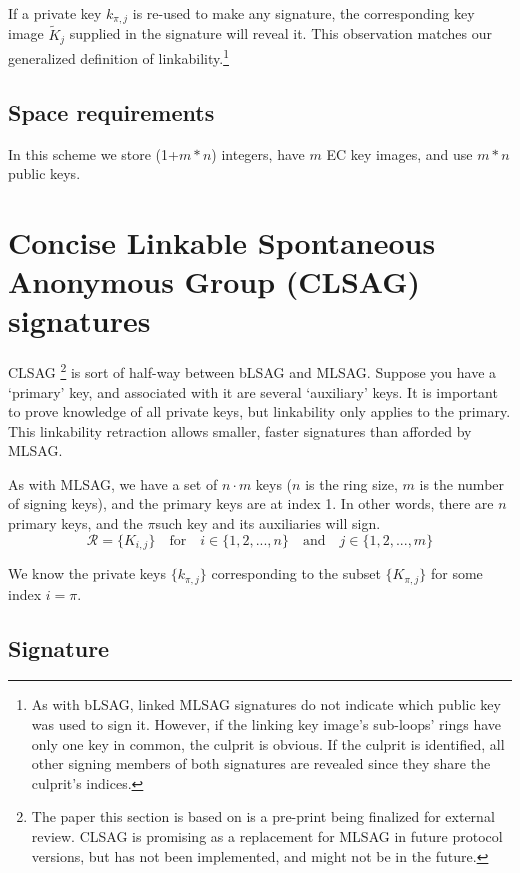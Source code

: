If a private key \(k_{\pi, j}\) is re-used to make any signature, the corresponding key image \(\tilde{K}_j\) supplied in the signature will reveal it. This observation matches our generalized definition of linkability.\footnote{As with bLSAG, linked MLSAG signatures do not indicate which public key was used to sign it. However, if the linking key image's sub-loops' rings have only one key in common, the culprit is obvious. If the culprit is identified, all other signing members of both signatures are revealed since they share the culprit's indices.}


\subsection*{Space requirements}

In this scheme we store (1+$m*n$) integers, have $m$ EC key images, and use $m*n$ public keys.



\section{Concise Linkable Spontaneous Anonymous Group (CLSAG) signatures}
\label{sec:CLSAG}

CLSAG \cite{MRL-0011-CLSAG}\footnote{The paper this section is based on is a pre-print being finalized for external review. CLSAG is promising as a replacement for MLSAG in future protocol versions, but has not been implemented, and might not be in the future.} is sort of half-way between bLSAG and MLSAG. Suppose you have a `primary' key, and associated with it are several `auxiliary' keys. It is important to prove knowledge of all private keys, but linkability only applies to the primary. This linkability retraction allows smaller, faster signatures than afforded by MLSAG.

As with MLSAG, we have a set of \(n \cdot m\) keys ($n$ is the ring size, $m$ is the number of signing keys), and the primary keys are at index 1. In other words, there are $n$ primary keys, and the $\pi$\nth such key and its auxiliaries will sign.\vspace{.175cm}
\[\mathcal{R} = \{K_{i,j}\}  \quad \textrm{for} \quad  i \in \{1, 2, ..., n\} \quad \textrm{and} \quad j \in \{1, 2, ..., m\}\]

We know the private keys \(\{k_{\pi, j}\}\) corresponding to the subset \(\{K_{\pi, j}\}\) for some index \(i = \pi\).


\subsection*{Signature}


